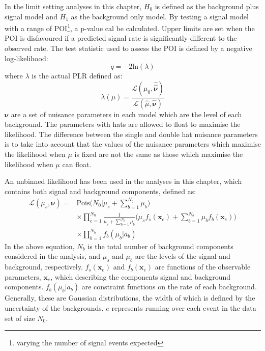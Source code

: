 \par
In the limit setting analyses in this chapter, $H_0$ is defined as the background plus signal model and $H_1$ as the background only model.
By testing a signal model with a range of POI\footnote{varying the number of signal events expected}, a p-value cal be calculated. 
Upper limits are set when the POI is disfavoured if a predicted signal rate is significantly different to the observed rate.
The test statistic used to assess the POI is defined by a negative log-likelihood:
\begin{equation}
    q = -2 \text{ln}(\lambda)
\end{equation}
where $\lambda$ is the actual PLR defined as:
\begin{equation}
    \lambda(\mu) = \frac{\mathcal{L}(\mu_0, \boldsymbol{\hat{\hat{\nu}}})}{\mathcal{L}(\hat{\mu}, \boldsymbol{\hat{\nu}})}
\end{equation}
$\boldsymbol{\nu}$ are a set of nuisance parameters in each model which are the level of each background.
The parameters with hats are allowed to float to maximise the likelihood.
The difference between the single and double hat nuisance parameters is to take into account that the values of the nuisance parameters which maximise the likelihood when $\mu$ is fixed are not the same as those which maximise the likelihood when $\mu$ can float.
\par
An unbinned likelihood has been used in the analyses in this chapter, which contains both signal and background components, defined as:
\begin{equation}
\begin{split}
    \mathcal{L}(\mu_s,\boldsymbol{\nu}) =& \text{Pois} \bigg(N_0 | \mu_s + \sum^{N_b}_{b=1} \mu_b \bigg) \\
                                         & \times \prod^{N_0}_{e=1} \frac{1}{\mu_s + \sum^{N_b}_{b=1} \mu_b} \bigg( \mu_s f_s (\boldsymbol{x}_e) + \sum^{N_b}_{b=1} \mu_b f_b(\boldsymbol{x}_e) \bigg) \\
                                         & \times \prod^{N_b}_{b=1} f_b(\mu_b | a_b)
\end{split}
\end{equation}
In the above equation, $N_b$ is the total number of background components considered in the analysis, and $\mu_s$ and $\mu_b$ are the levels of the signal and background, respectively. 
$f_s(\boldsymbol{x}_e)$ and $f_b(\boldsymbol{x}_e)$ are functions of the observable parameters,  $\boldsymbol{x}_e$, which describing the components signal and background components.
$f_b(\mu_b | a_b)$ are constraint functions on the rate of each background.
Generally, these are Gaussian distributions, the width of which is defined by the uncertainty of the backgrounds.
$e$ represents running over each event in the data set of size $N_0$.

